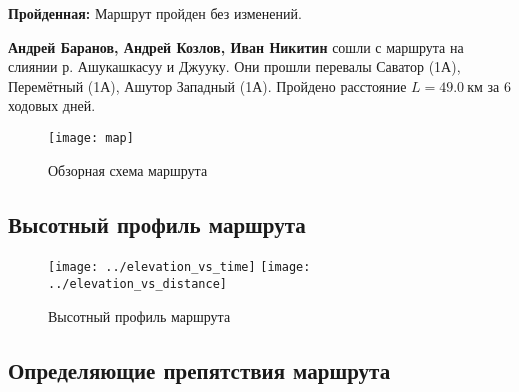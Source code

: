 \textbf{Пройденная:} Маршрут пройден без изменений.

\textbf{Андрей Баранов, Андрей Козлов, Иван Никитин} сошли с маршрута на слиянии р. Ашукашкасуу и Джууку. Они прошли перевалы Саватор (1А), Перемётный (1А), Ашутор Западный (1А). Пройдено расстояние $L=49.0~\text{км}$ за 6 ходовых дней.

\begin{figure}[h!tbp]
	\centering
	\texttt{[image: map]}
	\caption{Обзорная схема маршрута}
\end{figure}

\newpage
\subsection{Высотный профиль маршрута}

\begin{figure}[h!]
	\centering
	\texttt{[image: ../elevation\_vs\_time]}
	\texttt{[image: ../elevation\_vs\_distance]}
	\caption{Высотный профиль маршрута}
	\label{fig:heights}
\end{figure}

\newpage
\subsection{Определяющие препятствия маршрута}

